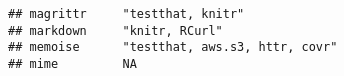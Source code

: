 \documentclass[]{book}
\begin{document}
\begin{verbatim}
## magrittr     "testthat, knitr"                                                                                                                                                                                                                                                                                                                                                                                                                                                                                                                                                                                                                                                                                         
## markdown     "knitr, RCurl"                                                                                                                                                                                                                                                                                                                                                                                                                                                                                                                                                                                                                                                                                            
## memoise      "testthat, aws.s3, httr, covr"                                                                                                                                                                                                                                                                                                                                                                                                                                                                                                                                                                                                                                                                            
## mime         NA                                                                                                                                                                                                                                                                                                                                                                                                                                                                                                                                                                                                                                                                                                        

\end{verbatim}
\end{document}
